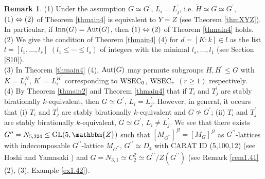 \documentclass{amsart}
\theoremstyle{plain}
\theoremstyle{definition}
\newtheorem{remark}[theorem]{Remark}
\theoremstyle{remark}
\newcommand{\bZ}{\mathbbm{Z}}\newcommand{\bQ}{\mathbbm{Q}}
\newcommand{\GL}{{\rm GL}}\newcommand{\SL}{{\rm SL}}
\newcounter{sub}\def\tr{\mbox{tr }}
\begin{document}
\begin{remark}
(1) 
Under the assumption $G\simeq G^\prime$, $L_i=L^\prime_j$, i.e. 
$\widetilde{H}\simeq G\simeq G^\prime$, 
${\rm (1)}\Leftrightarrow {\rm (2)}$ of Theorem \ref{thmain4} 
is equivalent to $Y=Z$ (see Theorem \ref{thmXYZ}). 
In particular, if ${\rm Inn}(G)={\rm Aut}(G)$, then 
${\rm (1)}\Leftrightarrow {\rm (2)}$ of Theorem \ref{thmain4} holds.\\ 
(2) 
We give the condition of Theorem \ref{thmain4} {\rm (4)} 
for $d=[K:k]\in l$ as 
the list $l=[l_1,\ldots,l_s]$ $(l_1\leq \cdots\leq l_s)$ 
of integers with the minimal $l_s,\ldots,l_1$ (see Section \ref{S10}).\\
(3) 
In Theorem \ref{thmain4} {\rm (4)}, 
${\rm Aut}(G)$ may permute subgroups $H, H^\prime\leq G$ 
with $K=L_i^H$, $K^\prime=L_i^{H^\prime}$ corresponding to 
${\rm WSEC}_0$, ${\rm WSEC}_r$ $(r\geq 1)$ respectively.\\
(4) 
By Theorem \ref{thmain2} and Theorem \ref{thmain4} that 
if $T_i$ and $T_j^\prime$ are stably birationally $k$-equivalent, 
then $G\simeq G^\prime$, $L_i=L_j^\prime$. 
However, in general, it occurs that 
(i) $T_i$ and $T_j^\prime$ are stably birationally $k$-equivalent 
and $G\not\simeq G^\prime$; 
(ii) $T_i$ and $T_j^\prime$ are stably birationally $k$-equivalent, 
$G\simeq G^\prime$, $L_i\neq L_j^\prime$.  
We see that there exists $G^{\prime\prime}=N_{5,324}\leq \GL(5,\bZ)$ 
such that $[M_{G^{\prime\prime}}]^{fl}=[M_G]^{fl}$ 
as $G^{\prime\prime}$-lattices 
with indecomposable $G^{\prime\prime}$-lattice $M_{G^{\prime\prime}}$, 
$G^{\prime\prime}\simeq D_4$ with CARAT ID (5,100,12) 
(see Hoshi and Yamasaki \cite[Chapter 3]{HY17}) 
and $G=N_{3,1}\simeq C_2^2\simeq G^{\prime\prime}/Z(G^{\prime\prime})$ 
(see Remark \ref{rem1.41} (2), (3), Example \ref{ex1.42}). 
\end{remark}
\end{document}
